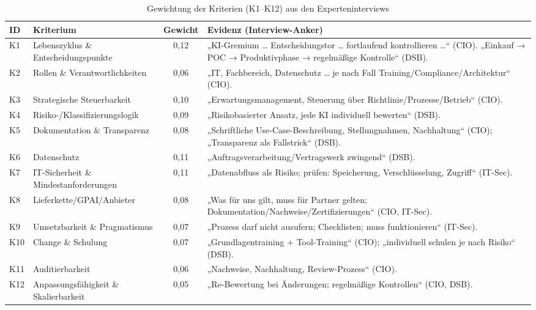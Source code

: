 \begin{table}[H]
  \centering
  \small
  \setlength{\tabcolsep}{6pt}
  \renewcommand{\arraystretch}{1.15}
  \begin{threeparttable}
    \caption{Gewichtung der Kriterien (K1–K12) aus den Experteninterviews}
    \label{tab:gewichte_interviews}
    \begin{tabularx}{\textwidth}{@{}l >{\raggedright\arraybackslash}p{4.2cm} S[table-format=1.2] >{\raggedright\arraybackslash}X@{}}
      \toprule
      \textbf{ID} & \textbf{Kriterium} & {\textbf{Gewicht}} & \textbf{Evidenz (Interview-Anker)} \\
      \midrule
      K1  & Lebenszyklus \& Entscheidungspunkte      & 0,12 & „KI-Gremium … Entscheidungstor … fortlaufend kontrollieren …“ (CIO). „Einkauf → POC → Produktivphase → regelmäßige Kontrolle“ (DSB). \\
      K2  & Rollen \& Verantwortlichkeiten         & 0,06 & „IT, Fachbereich, Datenschutz … je nach Fall Training/Compliance/Architektur“ (CIO). \\
      K3  & Strategische Steuerbarkeit             & 0,10 & „Erwartungsmanagement, Steuerung über Richtlinie/Prozesse/Betrieb“ (CIO). \\
      K4  & Risiko-/Klassifizierungslogik          & 0,09 & „Risikobasierter Ansatz, jede KI individuell bewerten“ (DSB). \\
      K5  & Dokumentation \& Transparenz           & 0,08 & „Schriftliche Use-Case-Beschreibung, Stellungnahmen, Nachhaltung“ (CIO); „Transparenz als Fallstrick“ (DSB). \\
      K6  & Datenschutz                            & 0,11 & „Auftragsverarbeitung/Vertragswerk zwingend“ (DSB). \\
      K7  & IT-Sicherheit \& Mindestanforderungen  & 0,11 & „Datenabfluss als Risiko; prüfen: Speicherung, Verschlüsselung, Zugriff“ (IT-Sec). \\
      K8  & Lieferkette/GPAI/Anbieter              & 0,08 & „Was für uns gilt, muss für Partner gelten; Dokumentation/Nachweise/Zertifizierungen“ (CIO, IT-Sec). \\
      K9  & Umsetzbarkeit \& Pragmatismus          & 0,07 & „Prozess darf nicht ausufern; Checklisten; muss funktionieren“ (IT-Sec). \\
      K10 & Change \& Schulung                     & 0,07 & „Grundlagentraining + Tool-Training“ (CIO); „individuell schulen je nach Risiko“ (DSB). \\
      K11 & Auditierbarkeit                        & 0,06 & „Nachweise, Nachhaltung, Review-Prozess“ (CIO). \\
      K12 & Anpassungsfähigkeit \& Skalierbarkeit  & 0,05 & „Re-Bewertung bei Änderungen; regelmäßige Kontrollen“ (CIO, DSB). \\
      \bottomrule
    \end{tabularx}
  \end{threeparttable}
\end{table}
\FloatBarrier

